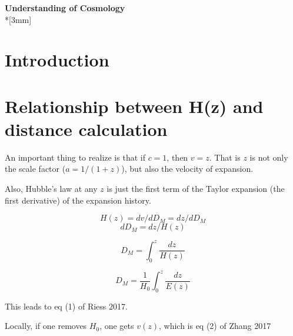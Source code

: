 \documentclass[11pt,a4paper]{article}
\begin{document}

\begin{center}
{\Large  \bf Understanding of Cosmology} \\*[3mm]

\end{center}




\section{Introduction}

\section{Relationship between H(z) and distance calculation}


An important thing to realize is that if $c = 1$, then $v = z$.  That is $z$ is not only the scale factor ($a = 1/(1+z)$), but also the velocity of expansion.

Also, Hubble's law at any $z$ is just the first term of the Taylor expansion (the first derivative) of the expansion history.


\[H(z) = dv/d{D_M} = dz/d{D_M}\]
\[d{D_M} = dz/H(z)\]

\[{D_M} = \mathop \int \nolimits_0^z \frac{{dz}}{{H(z)}}\]

\[{D_M} = \frac{1}{{{H_0}}}\mathop \int \nolimits_0^z \frac{{dz}}{{E(z)}}\]

This leads to eq (1) of Riess 2017.  

Locally, if one removes $H_0$, one gets $v(z)$, which is eq (2) of Zhang 2017 
\end{document}

